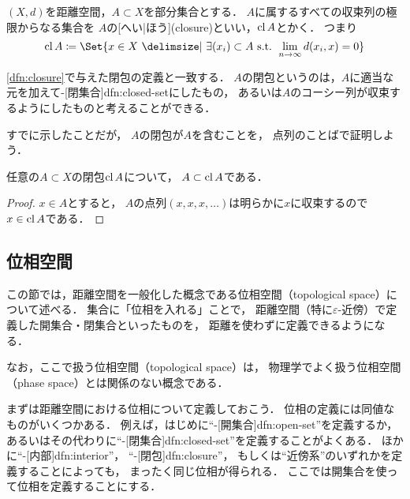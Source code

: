 \documentclass[../sotsu.tex]{subfiles}
\begin{document}
\begin{definition}[点列による閉包の定義]
    \label{dfn:closure-by-sequence}
    $(X, d)$を距離空間，$A \subset X$を部分集合とする．
    $A$に属するすべての収束列の極限からなる集合を
    $A$の[へい|ほう](closure)といい，$\operatorname{cl}{A}$とかく．
    つまり
    \begin{equation}
        \clsr{A} \coloneq \Set{ x \in X  \given  \exists (x_i) \subset A \text{ s.t. } \lim_{n \to \infty} d(x_i, x) = 0 }
    \end{equation}
\end{definition}

\cref{dfn:closure}で与えた閉包の定義と一致する．
$A$の閉包というのは，$A$に適当な元を加えて-[閉集合]{dfn:closed-set}にしたもの，
あるいは$A$のコーシー列が収束するようにしたものと考えることができる．

すでに示したことだが，
$A$の閉包が$A$を含むことを，
点列のことばで証明しよう．

\begin{corollary}
    任意の$A \subset X$の閉包$\operatorname{cl}{A}$について，
    $A \subset \operatorname{cl}{A}$である．
\end{corollary}

\begin{proof}
    $x \in A$とすると，
    $A$の点列$(x, x, x, \dotsc)$は明らかに$x$に収束するので$x \in \operatorname{cl}{A}$である．
\end{proof}



\subsection{位相空間}

この節では，距離空間を一般化した概念である位相空間（topological space）について述べる．
集合に「位相を入れる」ことで，
距離空間（特に$\varepsilon$-近傍）で定義した開集合・閉集合といったものを，
距離を使わずに定義できるようになる．

なお，ここで扱う位相空間（topological space）は，
物理学でよく扱う位相空間（phase space）とは関係のない概念である．

まずは距離空間における位相について定義しておこう．
位相の定義には同値なものがいくつかある．
例えば，はじめに``-[開集合]{dfn:open-set}''を定義するか，
あるいはその代わりに``-[閉集合]{dfn:closed-set}''を定義することがよくある．
ほかに``-[内部]{dfn:interior}''，
``-[閉包]{dfn:closure}''，
もしくは``近傍系''のいずれかを定義することによっても，
まったく同じ位相が得られる．
ここでは開集合を使って位相を定義することにする．
\end{document}
